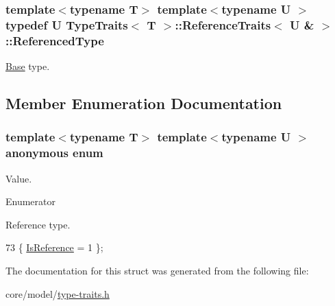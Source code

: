 \subsubsection[{\texorpdfstring{Referenced\+Type}{ReferencedType}}]{\setlength{\rightskip}{0pt plus 5cm}template$<$typename T$>$ template$<$typename U $>$ typedef U {\bf Type\+Traits}$<$ T $>$\+::{\bf Reference\+Traits}$<$ U \& $>$\+::{\bf Referenced\+Type}}\hypertarget{structTypeTraits_1_1ReferenceTraits_3_01U_01_6_01_4_a85db6c22d4420b470505b872e6ad6bcd}{}\label{structTypeTraits_1_1ReferenceTraits_3_01U_01_6_01_4_a85db6c22d4420b470505b872e6ad6bcd}
\hyperlink{structTypeTraits_1_1Base}{Base} type. 

\subsection{Member Enumeration Documentation}
\subsubsection[{\texorpdfstring{anonymous enum}{anonymous enum}}]{\setlength{\rightskip}{0pt plus 5cm}template$<$typename T$>$ template$<$typename U $>$ anonymous enum}\hypertarget{structTypeTraits_1_1ReferenceTraits_3_01U_01_6_01_4_afeb50cdbf179951fb5a06c5d01578a05}{}\label{structTypeTraits_1_1ReferenceTraits_3_01U_01_6_01_4_afeb50cdbf179951fb5a06c5d01578a05}
Value. \begin{Desc}
\item[Enumerator]\par
\begin{description}
\item[{\em 
Is\+Reference\hypertarget{structTypeTraits_1_1ReferenceTraits_3_01U_01_6_01_4_afeb50cdbf179951fb5a06c5d01578a05a183b1dc69f7498d77e15cd12d89d95aa}{}\label{structTypeTraits_1_1ReferenceTraits_3_01U_01_6_01_4_afeb50cdbf179951fb5a06c5d01578a05a183b1dc69f7498d77e15cd12d89d95aa}
}]Reference type. \end{description}
\end{Desc}

\begin{DoxyCode}
73 \{ \hyperlink{structTypeTraits_1_1ReferenceTraits_3_01U_01_6_01_4_afeb50cdbf179951fb5a06c5d01578a05a183b1dc69f7498d77e15cd12d89d95aa}{IsReference} = 1          \};
\end{DoxyCode}


The documentation for this struct was generated from the following file\+:\begin{DoxyCompactItemize}
\item 
core/model/\hyperlink{type-traits_8h}{type-\/traits.\+h}\end{DoxyCompactItemize}
